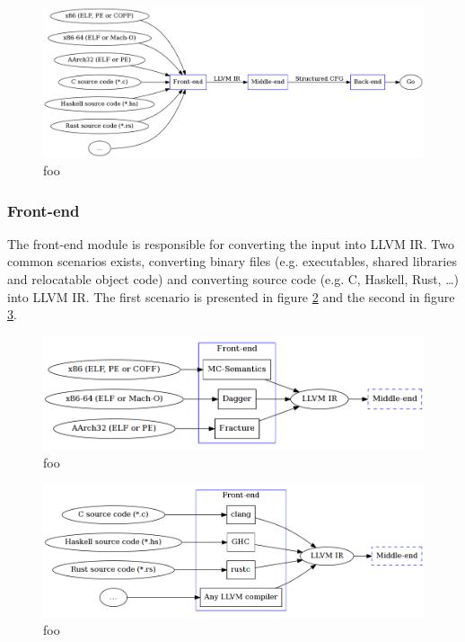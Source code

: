 \documentclass[12pt, a4paper]{article}
\begin{document}
\begin{figure}[htbp]
	\begin{center}
		\includegraphics[width=\textwidth]{inc/decompilation_pipeline.png}
		\caption{foo}
		\label{decompilation_pipeline}
	\end{center}
\end{figure}


\subsubsection{Front-end}


The front-end module is responsible for converting the input into LLVM IR. Two common scenarios exists, converting binary files (e.g. executables, shared libraries and relocatable object code) and converting source code (e.g. C, Haskell, Rust, …) into LLVM IR. The first scenario is presented in figure \ref{binary_to_llvm} and the second in figure \ref{source_to_llvm}.


\begin{figure}[htbp]
	\begin{center}
		\includegraphics[width=\textwidth]{inc/front-end_binary.png}
		\caption{foo}
		\label{binary_to_llvm}
	\end{center}
\end{figure}

\begin{figure}[htbp]
	\begin{center}
		\includegraphics[width=\textwidth]{inc/front-end_source.png}
		\caption{foo}
		\label{source_to_llvm}
	\end{center}
\end{figure}
\end{document}
